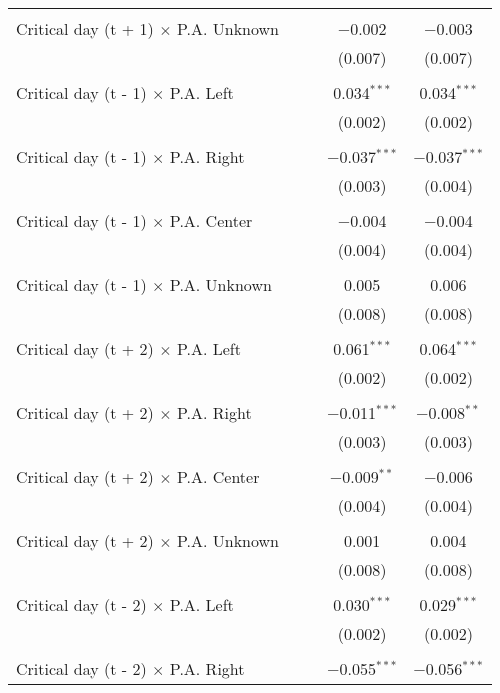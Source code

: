 \documentclass[
]{article}
\begin{document}
\begin{table}[!htbp]
{\begin{tabular}{@{\extracolsep{5pt}}lcccc}
  & & & & \\ 
 Critical day (t + 1) $\times$ P.A. Unknown &  &  & $-$0.002 & $-$0.003 \\ 
  &  &  & (0.007) & (0.007) \\ 
  & & & & \\ 
 Critical day (t - 1) $\times$ P.A. Left &  &  & 0.034$^{***}$ & 0.034$^{***}$ \\ 
  &  &  & (0.002) & (0.002) \\ 
  & & & & \\ 
 Critical day (t - 1) $\times$ P.A. Right &  &  & $-$0.037$^{***}$ & $-$0.037$^{***}$ \\ 
  &  &  & (0.003) & (0.004) \\ 
  & & & & \\ 
 Critical day (t - 1) $\times$ P.A. Center &  &  & $-$0.004 & $-$0.004 \\ 
  &  &  & (0.004) & (0.004) \\ 
  & & & & \\ 
 Critical day (t - 1) $\times$ P.A. Unknown &  &  & 0.005 & 0.006 \\ 
  &  &  & (0.008) & (0.008) \\ 
  & & & & \\ 
 Critical day (t + 2) $\times$ P.A. Left &  &  & 0.061$^{***}$ & 0.064$^{***}$ \\ 
  &  &  & (0.002) & (0.002) \\ 
  & & & & \\ 
 Critical day (t + 2) $\times$ P.A. Right &  &  & $-$0.011$^{***}$ & $-$0.008$^{**}$ \\ 
  &  &  & (0.003) & (0.003) \\ 
  & & & & \\ 
 Critical day (t + 2) $\times$ P.A. Center &  &  & $-$0.009$^{**}$ & $-$0.006 \\ 
  &  &  & (0.004) & (0.004) \\ 
  & & & & \\ 
 Critical day (t + 2) $\times$ P.A. Unknown &  &  & 0.001 & 0.004 \\ 
  &  &  & (0.008) & (0.008) \\ 
  & & & & \\ 
 Critical day (t - 2) $\times$ P.A. Left &  &  & 0.030$^{***}$ & 0.029$^{***}$ \\ 
  &  &  & (0.002) & (0.002) \\ 
  & & & & \\ 
 Critical day (t - 2) $\times$ P.A. Right &  &  & $-$0.055$^{***}$ & $-$0.056$^{***}$ \\ 

\end{tabular}}
\end{table}
\end{document}
